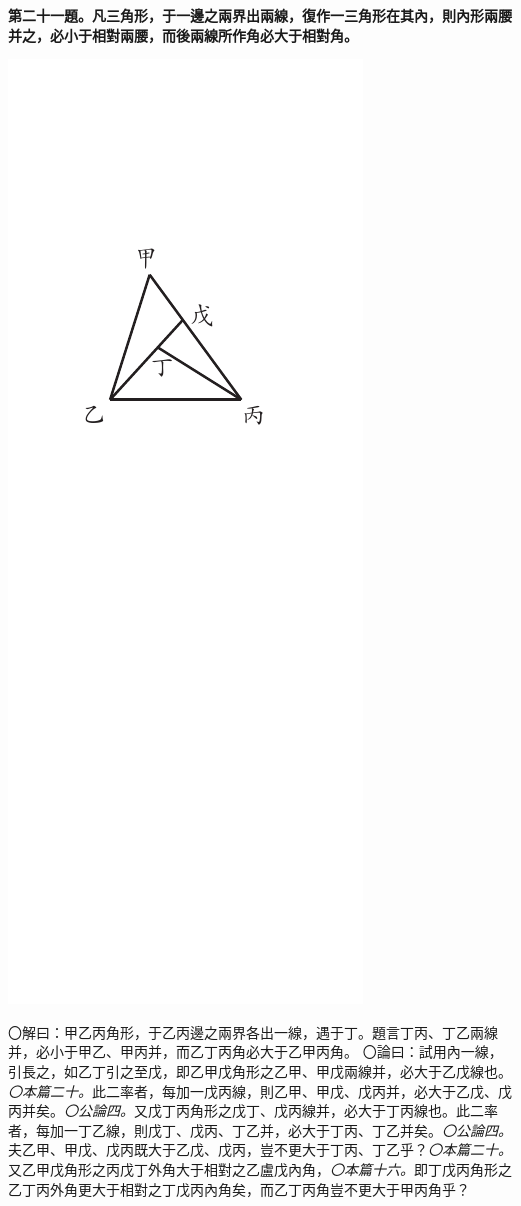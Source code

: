 \documentclass[12pt,b5paper,landscape]{article}
\newcommand{\ccom}[1]{{\footnotesize \emph{〇#1}}}
\newcommand{\bcom}[1]{〇#1}
\newcommand{\cthm}[1]{{
\vspace{8pt}

\bfseries #1}}
\begin{document}
\begin{multicols}{2}
\cthm{第二十一題。凡三角形，于一邊之兩界出兩線，復作一三角形在其內，則內形兩腰并之，必小于相對兩腰，而後兩線所作角必大于相對角。}
\begin{center}
    \includegraphics[angle=90]{eu66}  
\end{center}
\bcom{解曰：甲乙丙角形，于乙丙邊之兩界各出一線，遇于丁。題言丁丙、丁乙兩線并，必小于甲乙、甲丙并，而乙丁丙角必大于乙甲丙角。}
\bcom{論曰：試用內一線，引長之，如乙丁引之至戊，即乙甲戊角形之乙甲、甲戊兩線并，必大于乙戊線也。\ccom{本篇二十。}此二率者，每加一戊丙線，則乙甲、甲戊、戊丙并，必大于乙戊、戊丙并矣。\ccom{公論四。}又戊丁丙角形之戊丁、戊丙線并，必大于丁丙線也。此二率者，每加一丁乙線，則戊丁、戊丙、丁乙并，必大于丁丙、丁乙并矣。\ccom{公論四。}夫乙甲、甲戊、戊丙既大于乙戊、戊丙，豈不更大于丁丙、丁乙乎？\ccom{本篇二十。}又乙甲戊角形之丙戊丁外角大于相對之乙盧戊內角，\ccom{本篇十六。}即丁戊丙角形之乙丁丙外角更大于相對之丁戊丙內角矣，而乙丁丙角豈不更大于甲丙角乎？}


\end{multicols}
\end{document}

